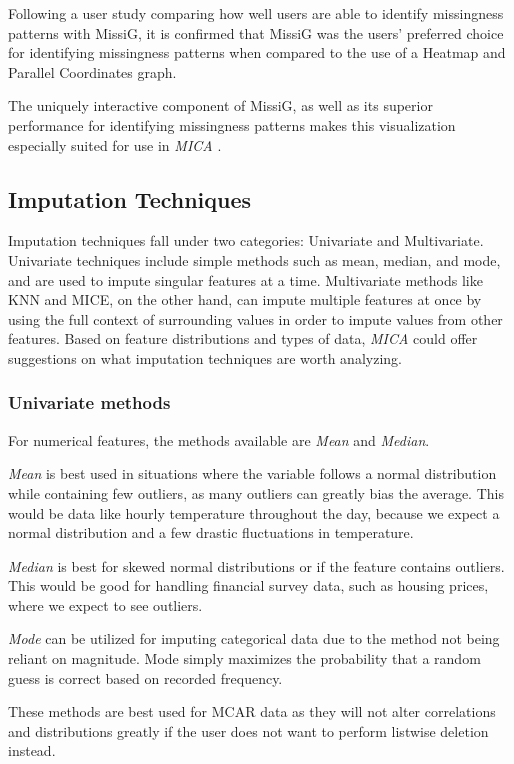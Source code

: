 \documentclass[a4paper, 11pt]{article}
\newcommand{\mica}{\textit{MICA }}
\begin{document}
Following a user study comparing how well users are able to identify
missingness patterns with MissiG, it is confirmed that MissiG was the users'
preferred choice for identifying missingness patterns when compared to the use
of a Heatmap and Parallel Coordinates graph.

The uniquely interactive component of MissiG, as well as its superior
performance for identifying missingness patterns makes this visualization
especially suited for use in \mica.

\subsection{Imputation Techniques}
Imputation techniques fall under two categories: Univariate and Multivariate.
Univariate techniques include simple methods such as mean, median, and mode, and
are used to impute singular features at a time. Multivariate methods like KNN
and MICE, on the other hand, can impute multiple features at once by using the
full context of surrounding values in order to impute values from other
features. Based on feature distributions and types of data, \mica could offer
suggestions on what imputation techniques are worth analyzing. 


\subsubsection{Univariate methods}
For numerical features, the methods available are \textit{Mean} and
\textit{Median}. 

\textit{Mean} is best used in situations where the variable follows a normal
distribution while containing few outliers, as many outliers can greatly bias
the average. This would be data like hourly temperature throughout the day,
because we expect a normal distribution and a few drastic fluctuations in
temperature. 

\textit{Median} is best for skewed normal distributions or if the feature
contains outliers. This would be good for handling financial survey data, such
as housing prices, where we expect to see outliers. 

\textit{Mode} can be utilized for imputing categorical data due to the method
not being reliant on magnitude. Mode simply maximizes the probability that a
random guess is correct based on recorded frequency.

These methods are best used for MCAR data as they will not alter correlations
and distributions greatly if the user does not want to perform listwise
deletion instead. 
\end{document}
